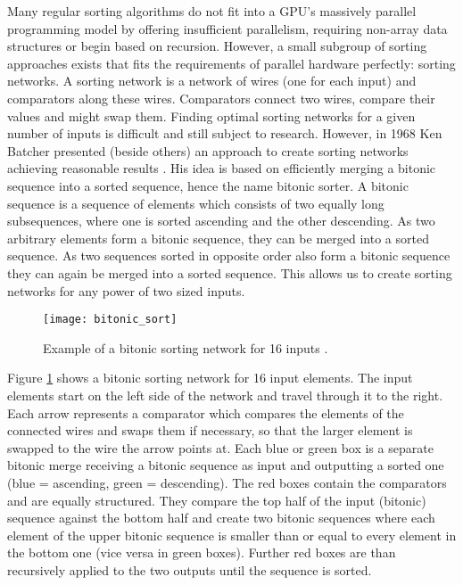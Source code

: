 Many regular sorting algorithms do not fit into a GPU's massively parallel programming model by offering insufficient parallelism, requiring non-array data structures or begin based on recursion. However, a small subgroup of sorting approaches exists that fits the requirements of parallel hardware perfectly: sorting networks. A sorting network is a network of wires (one for each input) and comparators along these wires. Comparators connect two wires, compare their values and might swap them.
Finding optimal sorting networks for a given number of inputs is difficult and still subject to research. However, in 1968 Ken Batcher presented (beside others) an approach to create sorting networks achieving reasonable results \cite{sort_bitonic}. His idea is based on efficiently merging a bitonic sequence into a sorted sequence, hence the name bitonic sorter. A bitonic sequence is a sequence of elements which consists of two equally long subsequences, where one is sorted ascending and the other descending. As two arbitrary elements form a bitonic sequence, they can be merged into a sorted sequence. As two sequences sorted in opposite order also form a bitonic sequence they can again be merged into a sorted sequence. This allows us to create sorting networks for any power of two sized inputs.

\begin{figure}[h]
\centering
\texttt{[image: bitonic\_sort]}
\caption{Example of a bitonic sorting network for 16 inputs \cite{wiki_bitonic_sort}.}
\label{fig:bitonic_sort}
\end{figure}

Figure \ref{fig:bitonic_sort} shows a bitonic sorting network for 16 input elements. The input elements start on the left side of the network and travel through it to the right. Each arrow represents a comparator which compares the elements of the connected wires and swaps them if necessary, so that the larger element is swapped to the wire the arrow points at. Each blue or green box is a separate bitonic merge receiving a bitonic sequence as input and outputting a sorted one (blue = ascending, green = descending). The red boxes contain the comparators and are equally structured. They compare the top half of the input (bitonic) sequence against the bottom half and create two bitonic sequences where each element of the upper bitonic sequence is smaller than or equal to every element in the bottom one (vice versa in green boxes). Further red boxes are than recursively applied to the two outputs until the sequence is sorted.

